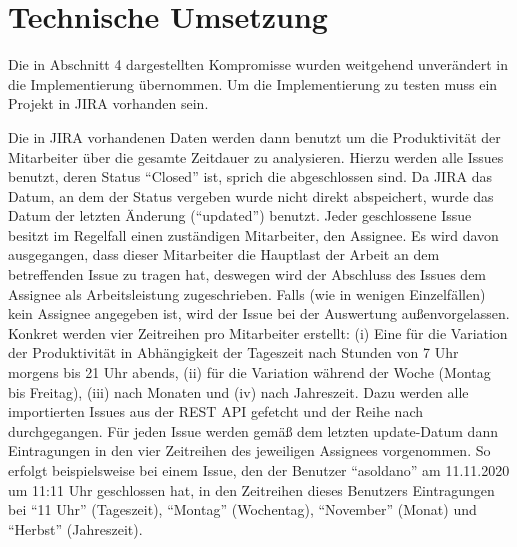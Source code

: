 \documentclass[a4paper,12pt,]{article}
\begin{document}
\section{Technische Umsetzung}

Die in Abschnitt 4 dargestellten Kompromisse wurden weitgehend unverändert in die Implementierung übernommen. Um die Implementierung zu testen muss ein Projekt in JIRA vorhanden sein.

Die in JIRA vorhandenen Daten werden dann benutzt um die Produktivität der Mitarbeiter über die gesamte Zeitdauer zu analysieren. Hierzu werden alle Issues benutzt, deren Status ``Closed'' ist, sprich die abgeschlossen sind. Da JIRA das Datum, an dem der Status vergeben wurde nicht direkt abspeichert, wurde das Datum der letzten Änderung (``updated'') benutzt. Jeder geschlossene Issue besitzt im Regelfall einen zuständigen Mitarbeiter, den Assignee. Es wird davon ausgegangen, dass dieser Mitarbeiter die Hauptlast der Arbeit an dem betreffenden Issue zu tragen hat, deswegen wird der Abschluss des Issues dem Assignee als Arbeitsleistung zugeschrieben. Falls (wie in wenigen Einzelfällen) kein Assignee angegeben ist, wird der Issue bei der Auswertung außenvorgelassen. Konkret werden vier Zeitreihen pro Mitarbeiter erstellt: (i) Eine für die Variation der Produktivität in Abhängigkeit der Tageszeit nach Stunden von 7 Uhr morgens bis 21 Uhr abends, (ii) für die Variation während der Woche (Montag bis Freitag), (iii) nach Monaten und (iv) nach Jahreszeit. Dazu werden alle importierten Issues aus der REST API gefetcht und der Reihe nach durchgegangen. Für jeden Issue werden gemäß dem letzten update-Datum dann Eintragungen in den vier Zeitreihen des jeweiligen Assignees vorgenommen. So erfolgt beispielsweise bei einem Issue, den der Benutzer ``asoldano'' am 11.11.2020 um 11:11 Uhr geschlossen hat, in den Zeitreihen dieses Benutzers Eintragungen bei ``11 Uhr'' (Tageszeit), ``Montag'' (Wochentag), ``November'' (Monat) und ``Herbst'' (Jahreszeit). 
\end{document}
